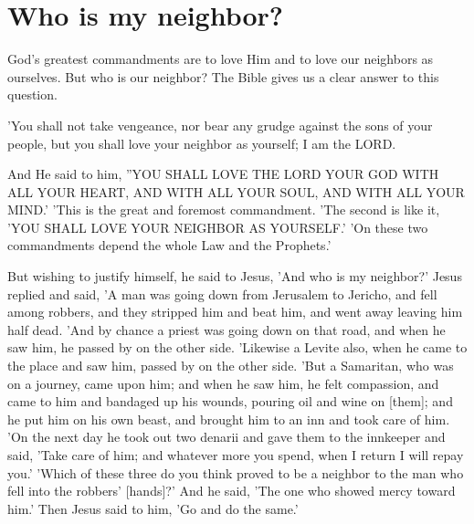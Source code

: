 \chapter{Who is my neighbor?}

God's greatest commandments are to love Him and to love our neighbors as ourselves. But who is our neighbor? The Bible gives us a clear answer to this question.


\begin{scripture}[Leviticus 19:18]
    'You shall not take vengeance, nor bear any grudge against the sons of your people, but you shall love your neighbor as yourself; I am the LORD.
\end{scripture}

\begin{scripture}[Matthew 22:37-40]
    And He said to him, ''YOU SHALL LOVE THE LORD YOUR GOD WITH ALL YOUR HEART, AND WITH ALL YOUR SOUL, AND WITH ALL YOUR MIND.'
    'This is the great and foremost commandment.
    'The second is like it, 'YOU SHALL LOVE YOUR NEIGHBOR AS YOURSELF.'
    'On these two commandments depend the whole Law and the Prophets.'
\end{scripture}

\begin{scripture}[Luke 10:29-37]
    But wishing to justify himself, he said to Jesus, 'And who is my neighbor?'
    Jesus replied and said, 'A man was going down from Jerusalem to Jericho, and fell among robbers, and they stripped him and beat him, and went away leaving him half dead.
    'And by chance a priest was going down on that road, and when he saw him, he passed by on the other side.
    'Likewise a Levite also, when he came to the place and saw him, passed by on the other side.
    'But a Samaritan, who was on a journey, came upon him; and when he saw him, he felt compassion,
    and came to him and bandaged up his wounds, pouring oil and wine on [them]; and he put him on his own beast, and brought him to an inn and took care of him.
    'On the next day he took out two denarii and gave them to the innkeeper and said, 'Take care of him; and whatever more you spend, when I return I will repay you.'
    'Which of these three do you think proved to be a neighbor to the man who fell into the robbers' [hands]?'
    And he said, 'The one who showed mercy toward him.' Then Jesus said to him, 'Go and do the same.'
\end{scripture}


